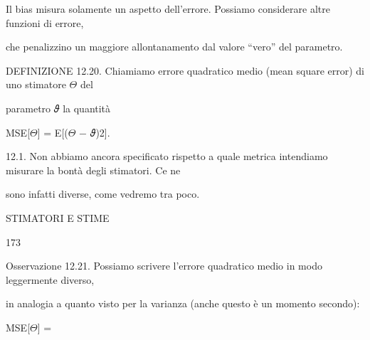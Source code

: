 \documentclass[a4paper,portrait,12pt]{article}
\begin{document}
\begin{flushleft}
Il bias misura solamente un aspetto dell'errore. Possiamo considerare altre funzioni di errore,
\end{flushleft}


\begin{flushleft}
che penalizzino un maggiore allontanamento dal valore {``}vero'' del parametro.
\end{flushleft}


\begin{flushleft}
DEFINIZIONE 12.20. Chiamiamo errore quadratico medio (mean square error) di uno stimatore $\Theta$ del
\end{flushleft}


\begin{flushleft}
parametro 𝜗 la quantit\`{a}
\end{flushleft}


\begin{flushleft}
MSE[$\Theta$] = E[($\Theta$ $-$ 𝜗)2].
\end{flushleft}


\begin{flushleft}
12.1. Non abbiamo ancora specificato rispetto a quale metrica intendiamo misurare la bont\`{a} degli stimatori. Ce ne
\end{flushleft}


\begin{flushleft}
sono infatti diverse, come vedremo tra poco.
\end{flushleft}





\begin{flushleft}
 STIMATORI E STIME
\end{flushleft}





173





\begin{flushleft}
Osservazione 12.21. Possiamo scrivere l'errore quadratico medio in modo leggermente diverso,
\end{flushleft}


\begin{flushleft}
in analogia a quanto visto per la varianza (anche questo \`{e} un momento secondo):
\end{flushleft}


\begin{flushleft}
MSE[$\Theta$] =
\end{flushleft}
\end{document}
